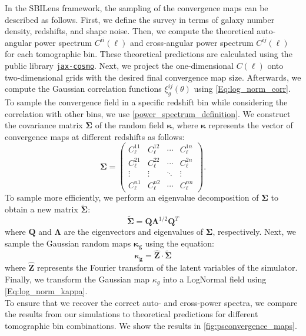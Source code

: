 \documentclass{aa}
\begin{document}
 In the SBILens framework, the sampling of the convergence maps can be described as follows. 
First, we define the survey in terms of galaxy number density, redshifts, and shape noise.  Then, we compute the theoretical auto-angular power spectrum $C^{ii}(\ell)$ and cross-angular power spectrum $C^{ij}(\ell)$ for each tomographic bin. These theoretical predictions are calculated using the public library \href{https://github.com/DifferentiableUniverseInitiative/jax_cosmo}{\texttt{jax-cosmo}}. 
Next, we project the one-dimensional $C(\ell)$ onto two-dimensional grids with the desired final convergence map size. Afterwards, we compute the Gaussian correlation functions $\xi^{ij}_g(\theta)$ using \autoref{Eq:log_norm_corr}.
 To sample the convergence field in a specific redshift bin while considering the correlation with other bins, we use \autoref{power_spectrum_definition}. 
We construct the covariance matrix $\bm{\Sigma}$ of the random field $\bm{\kappa}$, where $\bm{\kappa}$ represents the vector of convergence maps at different redshifts as follows:
 \begin{equation}
    \bm{\Sigma}= 
    \begin{pmatrix}
    C_{\ell}^{11} & C_{\ell}^{12} & \cdots & C_{\ell}^{1n} \\
    C_{\ell}^{21} & C_{\ell}^{22} & \cdots & C_{\ell}^{2n} \\
    \vdots  & \vdots  & \ddots & \vdots  \\
    C_{\ell}^{n1} & C_{\ell}^{n2} & \cdots & C_{\ell}^{nn} 
    \end{pmatrix}.
\end{equation}
To sample more efficiently, we perform an eigenvalue decomposition of $\bm{\Sigma}$ to obtain a new matrix $\tilde{\bm{\Sigma}}$:
\begin{equation}
    \tilde{\bm{\Sigma} }=\bm{Q}\bm{\Lambda}^{1/2}\bm{Q}^{T}
\end{equation}
where $\bm{Q}$ and $\bm{\Lambda}$ are the eigenvectors and eigenvalues of $\bm{\Sigma}$, respectively.
Next, we sample the Gaussian random maps $\bm{\kappa_g}$ using the equation:
\begin{equation}
     \bm{\kappa_g}=\hat{\bm{Z}}\cdot\tilde{\bm{\Sigma} }
\end{equation}
where $\hat{\bm{Z}}$ represents the Fourier transform of the latent variables of the simulator.
Finally, we transform the Gaussian map $\kappa_g$ into a LogNormal field using \autoref{Eq:log_norm_kappa}.
 \\
To ensure that we recover the correct auto- and cross-power spectra, we compare the results from our simulations to theoretical predictions for different tomographic bin combinations. We show the results in \autoref{fig:psconvergence_maps}. 
\end{document}
